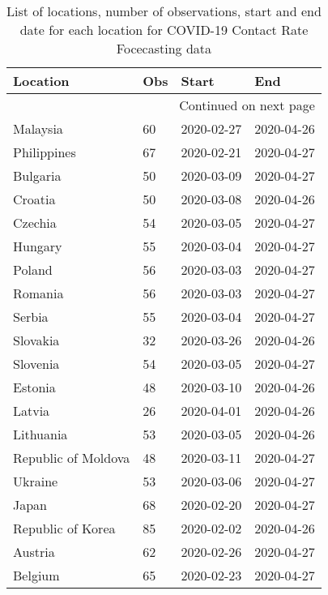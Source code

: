 \begin{longtable}{llll}
\caption{List of locations, number of observations, start and end date for each location for COVID-19 Contact Rate Focecasting data}\label{table:covid_data_description}\\
\toprule
                   Location & Obs &      Start &        End \\
\midrule
\endhead
\midrule
\multicolumn{4}{r}{{Continued on next page}} \\
\midrule
\endfoot

\bottomrule
\endlastfoot
                   Malaysia &  60 & 2020-02-27 & 2020-04-26 \\
                Philippines &  67 & 2020-02-21 & 2020-04-27 \\
                   Bulgaria &  50 & 2020-03-09 & 2020-04-27 \\
                    Croatia &  50 & 2020-03-08 & 2020-04-26 \\
                    Czechia &  54 & 2020-03-05 & 2020-04-27 \\
                    Hungary &  55 & 2020-03-04 & 2020-04-27 \\
                     Poland &  56 & 2020-03-03 & 2020-04-27 \\
                    Romania &  56 & 2020-03-03 & 2020-04-27 \\
                     Serbia &  55 & 2020-03-04 & 2020-04-27 \\
                   Slovakia &  32 & 2020-03-26 & 2020-04-26 \\
                   Slovenia &  54 & 2020-03-05 & 2020-04-27 \\
                    Estonia &  48 & 2020-03-10 & 2020-04-26 \\
                     Latvia &  26 & 2020-04-01 & 2020-04-26 \\
                  Lithuania &  53 & 2020-03-05 & 2020-04-26 \\
        Republic of Moldova &  48 & 2020-03-11 & 2020-04-27 \\
                    Ukraine &  53 & 2020-03-06 & 2020-04-27 \\
                      Japan &  68 & 2020-02-20 & 2020-04-27 \\
          Republic of Korea &  85 & 2020-02-02 & 2020-04-26 \\
                    Austria &  62 & 2020-02-26 & 2020-04-27 \\
                    Belgium &  65 & 2020-02-23 & 2020-04-27 \\

\end{longtable}
